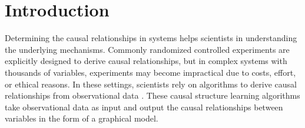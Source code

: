 \chapter{Introduction}
Determining the causal relationships in systems helps scientists in understanding the underlying mechanisms. Commonly randomized controlled experiments are explicitly designed to derive causal relationships, but in complex systems with thousands of variables, experiments may become impractical due to costs, effort, or ethical reasons. In these settings, scientists rely on algorithms to derive causal relationships from observational data \cite{pearlCausality2009,spirtesCausationPredictionSearch1993,neapolitanLearningBayesianNetworks2003,pearlProbabilisticReasoningIntelligent1988}. 
These causal structure learning algorithms take observational data as input and output the causal relationships between variables in the form of a graphical model.

